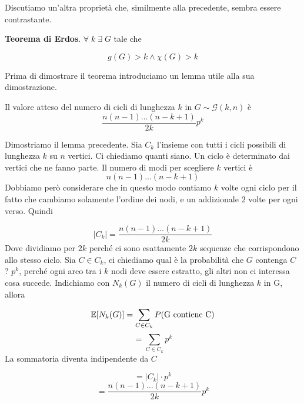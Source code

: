 \documentclass[12pt]{report}
\begin{document}
\noindent 
Discutiamo un'altra proprietà che, similmente alla precedente, sembra essere contrastante.

\begin{teo} \textbf{Teorema di Erdos}. $\forall \; k \; \exists  \; G$ tale che 

$$g(G) > k \land \chi(G) > k$$
    
\end{teo}

\noindent
Prima di dimostrare il teorema introduciamo un lemma utile alla sua dimostrazione.

\begin{lemma}
    Il valore atteso del numero di cicli di lunghezza $k$ in $G \sim \mathscr{G}(k,n)$ è $$\frac{n(n-1)\dots(n-k+1)}{2k} p^k$$
\end{lemma}
\begin{dimo}
    Dimostriamo il lemma precedente.
    Sia $C_k$ l'insieme con tutti i cicli possibili di lunghezza $k$ su $n$ vertici. Ci chiediamo quanti siano. Un ciclo è determinato dai vertici che ne fanno parte. Il numero di modi per scegliere $k$ vertici è 
    $$n (n-1) \dots (n-k+1)$$
    Dobbiamo però considerare che in questo modo contiamo $k$ volte ogni ciclo per il fatto che cambiamo solamente l'ordine dei nodi, e un addizionale $2$ volte per ogni verso. Quindi 

    $$|C_k| = \frac{n (n-1) \dots (n-k+1)}{2k}$$
    Dove dividiamo per $2k$ perché ci sono esattamente $2k$ sequenze che corrispondono allo stesso ciclo.
    Sia $C \in C_k$, ci chiediamo  qual è la probabilità che $G$ contenga $C$ ? $p^k$, perché ogni arco tra i $k$ nodi deve essere estratto, gli altri non ci interessa cosa succede.  Indichiamo con $N_k(G)$ il numero di cicli di lunghezza $k$ in G, allora

    $$\mathbb{E}[N_k(G)] = \sum_{C \in C_k} P(\text{G contiene C})$$
    $$= \sum_{C \in C_k} p^k$$
    La sommatoria diventa indipendente da $C$

    $$= |C_k| \cdot p^k$$
    $$= \frac{n (n-1) \dots (n-k+1)}{2k} p^k$$
\end{dimo}
\end{document}
